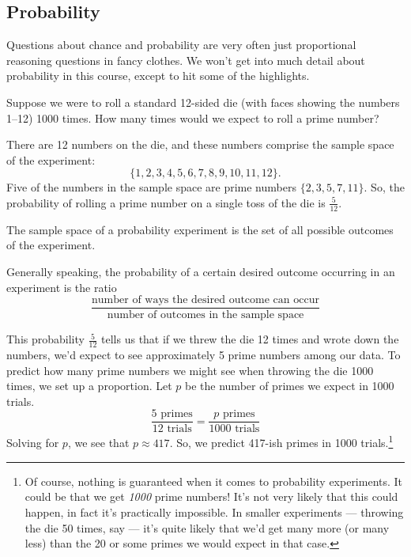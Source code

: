 \subsection{Probability}

Questions about chance and probability are very often just proportional reasoning questions in fancy clothes. We won't get into much detail about probability in this course, except to hit some of the highlights.

\begin{boxexplore}[1d12]
Suppose we were to roll a standard 12-sided die (with faces showing the numbers 1--12) 1000 times. How many times would we expect to roll a prime number?
\end{boxexplore}

There are 12 numbers on the die, and these numbers comprise the \gls{sample space} of the experiment: \[\{1, 2, 3, 4, 5, 6, 7, 8, 9, 10, 11, 12\}.\] Five of the numbers in the sample space are prime numbers $\{2, 3, 5, 7, 11\}$. So, the probability of rolling a prime number on a single toss of the die is $\frac{5}{12}$.

\begin{boxdef}
The sample space of a probability experiment is the set of all possible outcomes of the experiment.
\end{boxdef}

Generally speaking, the probability of a certain desired outcome occurring in an experiment is the ratio \[\frac{\text{number of ways the desired outcome can occur}}{\text{number of outcomes in the sample space}}\]

This probability $\frac{5}{12}$ tells us that if we threw the die 12 times and wrote down the numbers, we'd expect to see approximately 5 prime numbers among our data. To predict how many prime numbers we might see when throwing the die 1000 times, we set up a proportion. Let $p$ be the number of primes we expect in 1000 trials. \[\frac{5\text{ primes}}{12\text{ trials}} = \frac{p\text{ primes}}{1000\text{ trials}}\] Solving for $p$, we see that $p\approx417$. So, we predict 417-ish primes in 1000 trials.\footnote{Of course, nothing is guaranteed when it comes to probability experiments. It could be that we get \textit{1000} prime numbers! It's not very likely that this could happen, in fact it's practically impossible. In smaller experiments --- throwing the die 50 times, say --- it's quite likely that we'd get many more (or many less) than the 20 or some primes we would expect in that case.}

